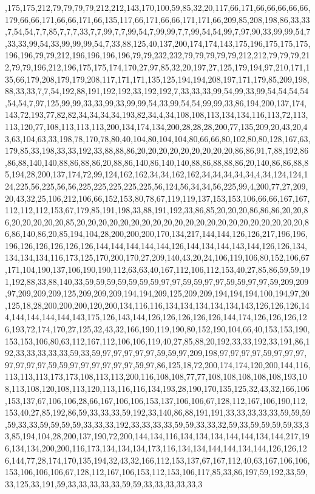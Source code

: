 ,175,175,212,79,79,79,79,212,212,143,170,100,59,85,32,20,117,66,171,66,66,66,66,66,179,66,66,171,66,66,171,66,135,117,66,171,66,66,171,171,66,209,85,208,198,86,33,33,7,54,54,7,7,85,7,7,7,33,7,7,99,7,7,99,54,7,99,99,7,7,99,54,54,99,7,97,90,33,99,99,54,7,33,33,99,54,33,99,99,99,54,7,33,88,125,40,137,200,174,174,143,175,196,175,175,175,196,196,79,79,212,196,196,196,196,79,79,232,232,79,79,79,79,79,212,212,79,79,79,212,79,79,196,212,196,175,175,174,170,27,97,85,32,20,197,27,125,179,194,97,210,171,135,66,179,208,179,179,208,117,171,171,135,125,194,194,208,197,171,179,85,209,198,88,33,33,7,7,54,192,88,191,192,192,33,192,192,7,33,33,33,99,54,99,33,99,54,54,54,54,54,54,7,97,125,99,99,33,33,99,33,99,99,54,33,99,54,54,99,99,33,86,194,200,137,174,143,72,193,77,82,82,34,34,34,34,193,82,34,4,34,108,108,113,134,134,116,113,72,113,113,120,77,108,113,113,113,200,134,174,134,200,28,28,28,200,77,135,209,20,43,20,43,63,104,63,33,198,78,170,78,80,40,104,80,104,104,80,66,66,80,102,80,80,128,167,63,179,85,33,198,33,33,192,33,88,88,86,20,20,20,20,20,20,20,20,20,86,86,91,7,88,192,86,86,88,140,140,88,86,88,86,20,88,86,140,86,140,140,88,86,88,88,86,20,140,86,86,88,85,194,28,200,137,174,72,99,124,162,162,34,34,162,162,34,34,34,34,34,4,34,124,124,124,225,56,225,56,56,225,225,225,225,225,56,124,56,34,34,56,225,99,4,200,77,27,209,20,43,32,25,106,212,106,66,152,153,80,78,67,119,119,137,153,153,106,66,66,167,167,112,112,112,153,67,179,85,191,198,33,88,191,192,33,86,85,20,20,20,86,86,86,20,20,86,20,20,20,20,20,85,20,20,20,20,20,20,20,20,20,20,20,20,20,20,20,20,20,20,20,20,20,86,86,140,86,20,85,194,104,28,200,200,200,170,134,217,144,144,126,126,217,196,196,196,126,126,126,126,126,144,144,144,144,144,126,144,134,144,143,144,126,126,134,134,134,134,116,173,125,170,200,170,27,209,140,43,20,24,106,119,106,80,152,106,67,171,104,190,137,106,190,190,112,63,63,40,167,112,106,112,153,40,27,85,86,59,59,191,192,88,33,88,140,33,59,59,59,59,59,59,59,97,97,59,59,97,97,59,59,97,97,59,209,209,97,209,209,209,125,209,209,209,194,194,209,125,209,209,194,194,194,100,194,97,20,125,18,28,200,200,200,120,200,134,116,116,134,134,134,134,134,143,126,126,126,144,144,144,144,144,143,175,126,143,144,126,126,126,126,126,144,174,126,126,126,126,193,72,174,170,27,125,32,43,32,166,190,119,190,80,152,190,104,66,40,153,153,190,153,153,106,80,63,112,167,112,106,106,119,40,27,85,88,20,192,33,33,192,33,191,86,192,33,33,33,33,33,59,33,59,97,97,97,97,97,59,59,97,209,198,97,97,97,97,59,97,97,97,97,97,97,97,59,59,97,97,97,97,97,97,59,97,86,125,18,72,200,174,174,120,200,144,116,113,113,113,173,173,108,113,113,200,116,108,108,77,77,108,108,108,108,108,193,108,113,108,120,108,113,120,113,116,116,134,193,28,190,170,135,125,32,43,32,166,106,153,137,67,106,106,28,66,167,106,106,153,137,106,106,67,128,112,167,106,190,112,153,40,27,85,192,86,59,33,33,33,59,192,33,140,86,88,191,191,33,33,33,33,33,59,59,59,59,33,33,59,59,59,59,33,33,33,192,33,33,33,33,59,59,33,33,32,59,33,59,59,59,59,33,33,85,194,104,28,200,137,190,72,200,144,134,116,134,134,134,144,144,134,144,217,196,134,134,200,200,116,173,134,134,134,173,116,134,134,144,144,134,144,126,126,126,144,77,28,174,170,135,194,32,43,32,166,112,153,137,67,167,112,40,63,167,106,106,153,106,106,106,67,128,112,167,106,153,112,153,106,117,85,33,86,197,59,192,33,59,33,125,33,191,59,33,33,33,33,33,59,59,33,33,33,33,33,3